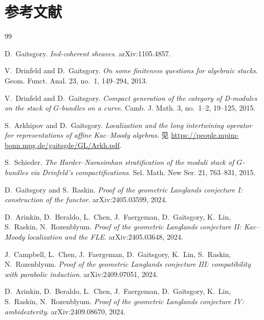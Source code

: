 
\chapter*{参考文献}

\begin{thebibliography}{99}
\setlength{\itemsep}{2pt}

 D.~Gaitsgory. \emph{Ind-coherent sheaves}. arXiv:1105.4857.

 V.~Drinfeld and D.~Gaitsgory. \emph{On some finiteness questions for
algebraic stacks}. Geom. Funct. Anal. 23, no.~1, 149--294, 2013.

 V.~Drinfeld and D.~Gaitsgory. \emph{Compact generation of the category of
D-modules on the stack of $G$-bundles on a curve}. Camb. J. Math. 3, no.~1--2, 19--125, 2015.

 S.~Arkhipov and D.~Gaitsgory. \emph{Localization and the long intertwining
operator for representations of affine Kac--Moody algebras}. 见
\url{https://people.mpim-bonn.mpg.de/gaitsgde/GL/Arkh.pdf}.

 S.~Schieder. \emph{The Harder--Narasimhan stratification of the moduli
stack of $G$-bundles via Drinfeld's compactifications}. Sel. Math. New Ser. 21, 763--831, 2015.

 D.~Gaitsgory and S.~Raskin. \emph{Proof of the geometric Langlands
conjecture I: construction of the functor}. arXiv:2405.03599, 2024.

 D.~Arinkin, D.~Beraldo, L.~Chen, J.~Faergeman, D.~Gaitsgory,
K.~Lin, S.~Raskin, N.~Rozenblyum. \emph{Proof of the geometric Langlands conjecture II:
Kac--Moody localization and the FLE}. arXiv:2405.03648, 2024.

 J.~Campbell, L.~Chen, J.~Faergeman, D.~Gaitsgory, K.~Lin,
S.~Raskin, N.~Rozenblyum. \emph{Proof of the geometric Langlands conjecture III: compatibility
with parabolic induction}. arXiv:2409.07051, 2024.

 D.~Arinkin, D.~Beraldo, L.~Chen, J.~Faergeman, D.~Gaitsgory,
K.~Lin, S.~Raskin, N.~Rozenblyum. \emph{Proof of the geometric Langlands conjecture IV:
ambidexterity}. arXiv:2409.08670, 2024.


\end{thebibliography}
